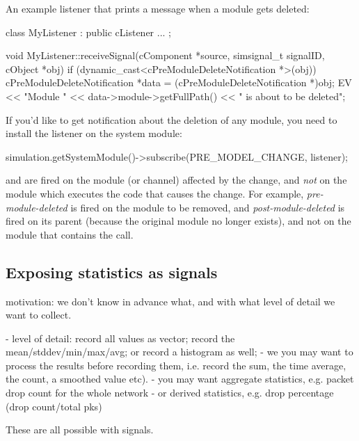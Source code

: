 \begin{note}
\begin{note}
An example listener that prints a message when a module gets deleted:

\begin{cpp}
class MyListener : public cListener
{
   ...
};

void MyListener::receiveSignal(cComponent *source, simsignal_t signalID, cObject *obj)
{
    if (dynamic_cast<cPreModuleDeleteNotification *>(obj))
    {
        cPreModuleDeleteNotification *data = (cPreModuleDeleteNotification *)obj;
        EV << "Module " << data->module->getFullPath() << " is about to be deleted\n";
    }
}
\end{cpp}

If you'd like to get notification about the deletion of any module, you need
to install the listener on the system module:

\begin{cpp}
simulation.getSystemModule()->subscribe(PRE_MODEL_CHANGE, listener);
\end{cpp}

\begin{note}
   and  are fired on the
  module (or channel) affected by the change, and \textit{not} on the module
  which executes the code that causes the change. For example,
  \textit{pre-module-deleted} is fired on the module to be removed, and
  \textit{post-module-deleted} is fired on its parent (because the original
  module no longer exists), and not on the module that contains the
   call.
\end{note}



\subsection{Exposing statistics as signals}

motivation: we don't know in advance what, and with what level of detail we want to collect.

- level of detail: record all values as vector; record the mean/stddev/min/max/avg;
  or record a histogram as well;
- we you may want to process the results before recording them, i.e. record the sum,
  the time average, the count, a smoothed value etc).
- you may want aggregate statistics, e.g. packet drop count for the whole network
- or derived statistics, e.g. drop percentage (drop count/total pks)

These are all possible with signals.


\end{note}
\end{note}

